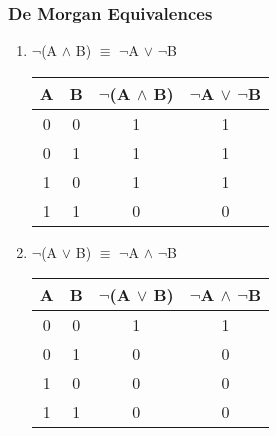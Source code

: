 \documentclass[11pt]{article}
\begin{document}
\subsubsection{De Morgan Equivalences}
\begin{enumerate}

  \item $\neg$(A $\land$ B) $\equiv$ $\neg$A $\lor$ $\neg$B

\begin{center}
  \begin{tabular}{| c | c | c | c |}
    \hline
    A & B & $\neg$(A $\land$ B) & $\neg$A $\lor$ $\neg$B \\ \hline
    0 & 0 & 1 & 1 \\
    0 & 1 & 1 & 1 \\ 
    1 & 0 & 1 & 1 \\
    1 & 1 & 0 & 0 \\ \hline
  \end{tabular}
\end{center}

  \item $\neg$(A $\lor$ B) $\equiv$ $\neg$A $\land$ $\neg$B

\begin{center}
  \begin{tabular}{| c | c | c | c |}
    \hline
    A & B & $\neg$(A $\lor$ B) & $\neg$A $\land$ $\neg$B \\ \hline
    0 & 0 & 1 & 1 \\
    0 & 1 & 0 & 0 \\ 
    1 & 0 & 0 & 0 \\
    1 & 1 & 0 & 0 \\ \hline
  \end{tabular}
\end{center}

\end{enumerate}
\end{document}
